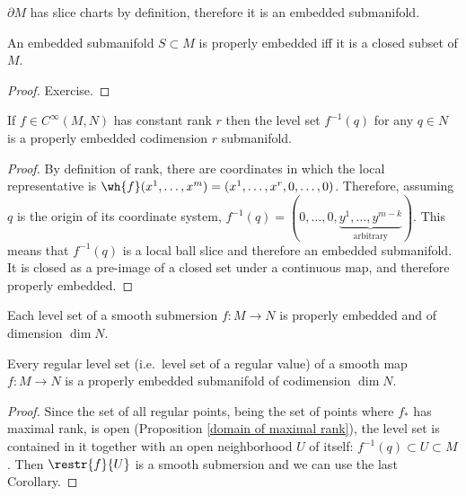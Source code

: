 \begin{cor}
$\partial M$ has slice charts by definition, therefore it is an embedded submanifold.
\end{cor}

\begin{prop}
An embedded submanifold  $S\subset M$ is properly embedded iff it is a closed subset of $M$.
\end{prop}
\begin{proof}
Exercise.
\end{proof}

\begin{thm}\label{thm level set submanifold}
    If $f\in C^\infty(M,N)$ has constant rank $r$ then the level set $f^{-1}(q)$ for any $q\in N$ is a properly embedded codimension $r$ submanifold.
\end{thm}
\begin{proof}
    By definition of rank, there are coordinates in which the local representative is $\wh{f}(x^1,\ldots,x^m)=(x^1,\ldots,x^r,0,\ldots,0)$. Therefore, assuming $q$ is the origin of its coordinate system, $f^{-1}(q)=(0,\ldots,0,\underbrace{y^1,\ldots,y^{m-k}}_{\text{arbitrary}})$. This means that $f^{-1}(q)$ is a local ball slice and therefore an embedded submanifold. It is closed as a pre-image of a closed set under a continuous map, and therefore properly embedded.
\end{proof}
\begin{cor}
Each level set of a smooth submersion $f:M\to N$ is properly embedded and of dimension $\dim N$.
\end{cor}
\begin{cor}
Every regular level set (i.e.\ level set of a regular value) of a smooth map $f:M\to N$ is a properly embedded submanifold of codimension $\dim N$.
\end{cor}
\begin{proof}
Since the set of all regular points, being the set of points where $f_{\ast}$ has maximal rank, is open (Proposition \ref{domain of maximal rank}), the level set is contained in it together with an open neighborhood $U$ of itself: $f^{-1}(q)\subset U\subset M$. Then $\restr{f}{U}$ is a smooth submersion and we can use the last Corollary.
\end{proof}

